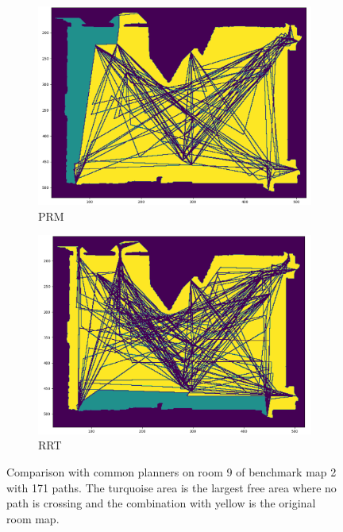 \begin{figure}[h]
\begin{subfigure}{.35\textwidth}
      \includegraphics[width=\textwidth]{figures/60_results/room9_disturbance_prm.png}
      \caption{PRM}
    \end{subfigure}%
    \begin{subfigure}{.35\textwidth}
      \centering
      \includegraphics[width=\textwidth]{figures/60_results/room9_disturbance_rrt.png}
      \caption{RRT}
    \end{subfigure}
    \caption[Comparison with common planners on room 9 of benchmark map 2]{Comparison with common planners on room 9 of benchmark map 2 with 171 paths. The turquoise area is the largest free area where no path is crossing and the combination with yellow is the original room map.}
    \label{fig:hou_room9_comparison}
\end{figure}

